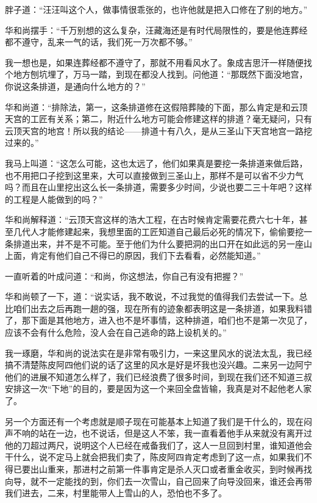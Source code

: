 胖子道：“汪汪叫这个人，做事情很乖张的，也许他就是把入口修在了别的地方。”

华和尚摆手：“千万别想的这么复杂，汪藏海还是有时代局限性的，要是他连葬经都不遵守，乱来一气的话，我们死一万次都不够。”

我一想也是，如果连葬经都不遵守了，那就不用看风水了。象成吉思汗一样随便找个地方刨坑埋了，万马一踏，到现在都没人找到。问他道：“那既然下面没地宫，你说这条排道，是通向什么地方的？”

华和尚道：“排除法，第一，这条排道修在这假陪葬陵的下面，那么肯定是和云顶天宫的工匠有关系；第二，附近什么地方可能会修建这样的排道？毫无疑问，只有云顶天宫的地宫！所以我的结论——排道十有八久，是从三圣山下天宫地宫一路挖过来的。”

我马上叫道：“这怎么可能，这也太远了，他们如果真是要挖一条排道来做后路，也不用把口子挖到这里来，大可以直接做到三圣山上，那样不是可以省不少力气吗？而且在山里挖出这么长一条排道，需要多少时间，少说也要二三十年吧？这样的工程是人能做到的吗？”

华和尚解释道：“云顶天宫这样的浩大工程，在古时候肯定需要花费六七十年，甚至几代人才能修建起来，我想里面的工匠知道自己最后必死的情况下，偷偷要挖一条排道出来，并不是不可能。至于他们为什么要把洞的出口开在如此远的另一座山上面，肯定有他们自己不得已的原因，我们下去看看，必然能知道。”

一直听着的叶成问道：“和尚，你这想法，你自己有没有把握？”

华和尚顿了一下，道：“说实话，我不敢说，不过我觉的值得我们去尝试一下。总比咱们出去之后再跑一趟的强，现在所有的迹象都表明这是一条排道，如果我料错了，那下面是其他地方，进入也不是坏事情，这种排道，咱们也不是第一次见了，应该不会有什么危险，没人会在自己逃命的路上设机关的。”

我一琢磨，华和尚的说法实在是非常有吸引力，一来这里风水的说法太乱，我已经搞不清楚陈皮阿四他们说的话了这里的风水是好是坏我也没兴趣。二来另一边阿宁他们的进展不知道怎么样了，我们已经浪费了很多时间，到现在我们还不知道三叔安排这一次“下地”的目的，要是因为这一个来回全盘皆输，我真是对不起他老人家了。

另一个方面还有一个考虑就是顺子现在可能基本上知道了我们是干什么的，现在闷声不响的站在一边，也不说话，但是这人不笨，我一直看着他手从来就没有离开过他的刀超过两尺，说明这个人已经在戒备我们了，这人一旦回到村里，谁知道他会干什么，说不定马上就会把我们卖了，陈皮阿四肯定考虑到了这一点，如果我们不得已要出山重来，那进村之前第一件事肯定是杀人灭口或者重金收买，到时候再找向导，就不一定能找的到，你们去一次雪山，自己回来了向导没回来，谁还会再带我们进去，二来，村里能带人上雪山的人，恐怕也不多了。


